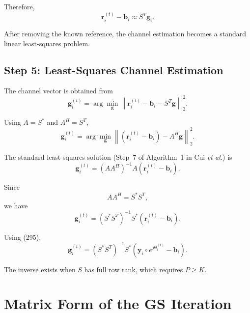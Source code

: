 \documentclass[12pt,a4paper]{article}
\begin{document}
Therefore,
\begin{equation}
\boxed{
\mathbf r_i^{(t)}-\mathbf b_i
\approx
S^T\mathbf g_i
}.
\tag{300}
\end{equation}

After removing the known reference, the channel estimation becomes a
standard linear least-squares problem.

\subsection{Step 5: Least-Squares Channel Estimation}

The channel vector is obtained from
\begin{equation}
\boxed{
\mathbf g_i^{(t)}
=
\arg\min_{\mathbf g}
\left\|
\mathbf r_i^{(t)}-\mathbf b_i-S^T\mathbf g
\right\|_2^2
}.
\tag{301}
\end{equation}

Using $A=S^*$ and $A^H=S^T$,
\begin{equation}
\mathbf g_i^{(t)}
=
\arg\min_{\mathbf g}
\left\|
(\mathbf r_i^{(t)}-\mathbf b_i)-A^H\mathbf g
\right\|_2^2.
\tag{302}
\end{equation}

The standard least-squares solution (Step~7 of Algorithm~1 in Cui
\emph{et al.}) is
\begin{equation}
\boxed{
\mathbf g_i^{(t)}
=
(AA^H)^{-1}A
\left(
\mathbf r_i^{(t)}-\mathbf b_i
\right)
}.
\tag{303}
\end{equation}

Since
\begin{equation}
AA^H
=
S^*S^T,
\tag{304}
\end{equation}
we have
\begin{equation}
\boxed{
\mathbf g_i^{(t)}
=
(S^*S^T)^{-1}S^*
\left(
\mathbf r_i^{(t)}-\mathbf b_i
\right)
}.
\tag{305}
\end{equation}

Using (295),
\begin{equation}
\boxed{
\mathbf g_i^{(t)}
=
(S^*S^T)^{-1}S^*
\left(
\mathbf y_i\circ e^{j\boldsymbol\theta_i^{(t)}}
-
\mathbf b_i
\right)
}.
\tag{306}
\end{equation}

The inverse exists when $S$ has full row rank, which requires
$P\geq K$.

\section{Matrix Form of the GS Iteration}
\end{document}
